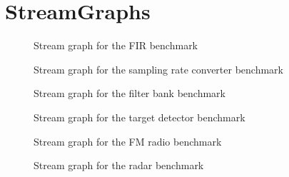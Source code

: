 \section{StreamGraphs}


\begin{figure}
\center
\epsfysize=3.0in
\caption{Stream graph for the FIR benchmark}
\label{fig:stream-graph-fir}
\end{figure}

\begin{figure}
\center
\epsfysize=3.0in
\caption{Stream graph for the sampling rate converter benchmark}
\label{fig:stream-graph-samplingrate}
\end{figure}

\begin{figure}
\center
\epsfxsize=3.0in
\caption{Stream graph for the filter bank benchmark}
\label{fig:stream-graph-filterbank}
\end{figure}

\begin{figure}
\center
\epsfxsize=3.0in
\caption{Stream graph for the target detector benchmark}
\label{fig:stream-graph-target}
\end{figure}

\begin{figure}
\center
\epsfxsize=3.0in
\caption{Stream graph for the FM radio benchmark}
\label{fig:stream-graph-fm}
\end{figure}

\begin{figure}
\center
\epsfxsize=3.0in
\caption{Stream graph for the radar benchmark}
\label{fig:stream-graph-beamform}
\end{figure}
